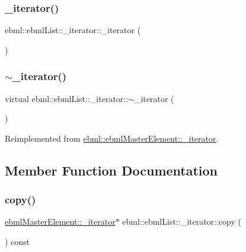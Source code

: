 \subsubsection{\texorpdfstring{\+\_\+iterator()}{\_iterator()}\hspace{0.1cm}{\footnotesize\ttfamily [2/2]}}
{\footnotesize\ttfamily ebml\+::ebml\+List\+::\+\_\+iterator\+::\+\_\+iterator (\begin{DoxyParamCaption}{ }\end{DoxyParamCaption})}

\mbox{\label{classebml_1_1ebmlList_1_1__iterator_ac9b20864cf56e1cf7767153ec53eefc0}} 
\subsubsection{\texorpdfstring{$\sim$\+\_\+iterator()}{~\_iterator()}}
{\footnotesize\ttfamily virtual ebml\+::ebml\+List\+::\+\_\+iterator\+::$\sim$\+\_\+iterator (\begin{DoxyParamCaption}{ }\end{DoxyParamCaption})\hspace{0.3cm}{\ttfamily [virtual]}}



Reimplemented from \mbox{\hyperlink{classebml_1_1ebmlMasterElement_1_1__iterator_a499f5fe9a5dddf51dd0ca181fc98f561}{ebml\+::ebml\+Master\+Element\+::\+\_\+iterator}}.



\subsection{Member Function Documentation}
\mbox{\label{classebml_1_1ebmlList_1_1__iterator_a25602ff7d15a50f42d0acba76d38680c}} 
\subsubsection{\texorpdfstring{copy()}{copy()}}
{\footnotesize\ttfamily \mbox{\hyperlink{classebml_1_1ebmlMasterElement_1_1__iterator}{ebml\+Master\+Element\+::\+\_\+iterator}}$\ast$ ebml\+::ebml\+List\+::\+\_\+iterator\+::copy (\begin{DoxyParamCaption}{ }\end{DoxyParamCaption}) const\hspace{0.3cm}{\ttfamily [virtual]}}



